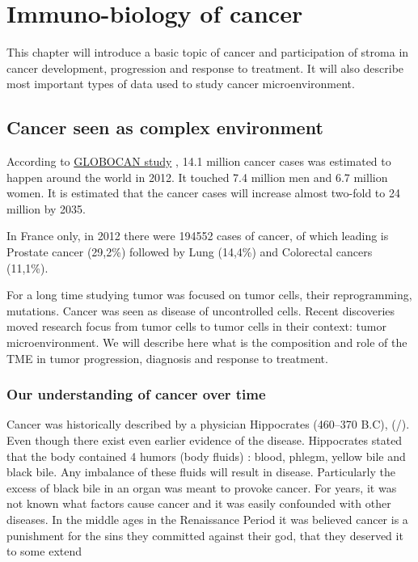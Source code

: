 \documentclass[12pt,]{book}
\theoremstyle{definition}
\theoremstyle{definition}
\theoremstyle{definition}
\theoremstyle{remark}
\begin{document}
{
\setcounter{tocdepth}{4}
\tableofcontents
}
\listoftables
\listoffigures
\hypertarget{intro}{%
\chapter{Immuno-biology of cancer}\label{intro}}

\setcounter{page}{11}

This chapter will introduce a basic topic of cancer and participation of
stroma in cancer development, progression and response to treatment. It
will also describe most important types of data used to study cancer
microenvironment.

\hypertarget{cancer-seen-as-complex-environment}{%
\section{Cancer seen as complex
environment}\label{cancer-seen-as-complex-environment}}

According to
\href{http://globocan.iarc.fr/Pages/fact_sheets_cancer.aspx}{GLOBOCAN
study} \citep{GLOBOCAN}, 14.1 million cancer cases was estimated to
happen around the world in 2012. It touched 7.4 million men and 6.7
million women. It is estimated that the cancer cases will increase
almost two-fold to 24 million by 2035.

In France only, in 2012 there were 194552 cases of cancer, of which
leading is Prostate cancer (29,2\%) followed by Lung (14,4\%) and
Colorectal cancers (11,1\%).

For a long time studying tumor was focused on tumor cells, their
reprogramming, mutations. Cancer was seen as disease of uncontrolled
cells. Recent discoveries moved research focus from tumor cells to tumor
cells in their context: tumor microenvironment. We will describe here
what is the composition and role of the TME in tumor progression,
diagnosis and response to treatment.

\hypertarget{our-understanding-of-cancer-over-time}{%
\subsection{Our understanding of cancer over
time}\label{our-understanding-of-cancer-over-time}}

Cancer was historically described by a physician Hippocrates (460--370
B.C), (\citet{https://www.ncbi.nlm.nih.gov/pmc/articles/PMC2927383}/).
Even though there exist even earlier evidence of the disease.
Hippocrates stated that the body contained 4 humors (body fluids) :
blood, phlegm, yellow bile and black bile. Any imbalance of these fluids
will result in disease. Particularly the excess of black bile in an
organ was meant to provoke cancer. For years, it was not known what
factors cause cancer and it was easily confounded with other diseases.
In the middle ages in the Renaissance Period it was believed cancer is a
punishment for the sins they committed against their god, that they
deserved it to some extend
\end{document}
